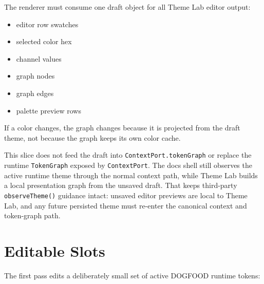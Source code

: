 The renderer must consume one draft object for all Theme Lab editor output:

\begin{itemize}
\tightlist
\item
  editor row swatches
\item
  selected color hex
\item
  channel values
\item
  graph nodes
\item
  graph edges
\item
  palette preview rows
\end{itemize}

If a color changes, the graph changes because it is projected from the draft theme, not because the graph keeps its own color cache.

This slice does not feed the draft into \texttt{C\allowbreak{}o\allowbreak{}n\allowbreak{}t\allowbreak{}e\allowbreak{}x\allowbreak{}t\allowbreak{}P\allowbreak{}o\allowbreak{}r\allowbreak{}t\allowbreak{}.\allowbreak{}t\allowbreak{}o\allowbreak{}k\allowbreak{}e\allowbreak{}n\allowbreak{}G\allowbreak{}r\allowbreak{}a\allowbreak{}p\allowbreak{}h} or replace the runtime \texttt{T\allowbreak{}o\allowbreak{}k\allowbreak{}e\allowbreak{}n\allowbreak{}G\allowbreak{}r\allowbreak{}a\allowbreak{}p\allowbreak{}h} exposed by \texttt{C\allowbreak{}o\allowbreak{}n\allowbreak{}t\allowbreak{}e\allowbreak{}x\allowbreak{}t\allowbreak{}P\allowbreak{}o\allowbreak{}r\allowbreak{}t}. The docs shell still observes the active runtime theme through the normal context path, while Theme Lab builds a local presentation graph from the unsaved draft. That keeps third-party \texttt{o\allowbreak{}b\allowbreak{}s\allowbreak{}e\allowbreak{}r\allowbreak{}v\allowbreak{}e\allowbreak{}T\allowbreak{}h\allowbreak{}e\allowbreak{}m\allowbreak{}e\allowbreak{}(\allowbreak{})} guidance intact: unsaved editor previews are local to Theme Lab, and any future persisted theme must re-enter the canonical context and token-graph path.

\section{Editable Slots}\label{record-187-editable-slots}

The first pass edits a deliberately small set of active DOGFOOD runtime tokens:


